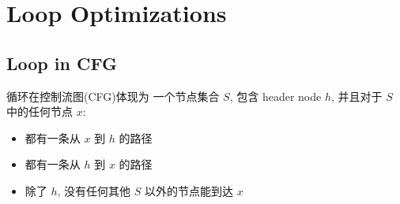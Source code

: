 \newpage
\section{Loop Optimizations}
\subsection{Loop in CFG}
循环在控制流图(CFG)体现为 一个节点集合 $S$, 包含 header node $h$, 并且对于 $S$ 中的任何节点 $x$:
\begin{itemize}
    \item 都有一条从 $x$ 到 $h$ 的路径
    \item 都有一条从 $h$ 到 $x$ 的路径
    \item 除了 $h$, 没有任何其他 $S$ 以外的节点能到达 $x$
\end{itemize}

